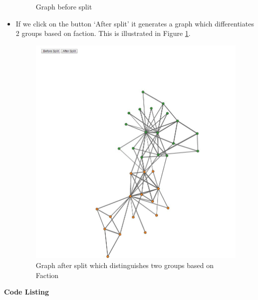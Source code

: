 \begin{itemize}
\begin{figure}[h!]
\begin{center}
\caption{Graph before split}
\label{fig:q3fig1}
\end{center}
\end{figure}
\newpage
\item   If we click on the button `After split' it generates a graph which differentiates 2 groups based on faction. This is illustrated in Figure \ref{fig:q3fig1}.
\begin{figure}[h!]
\begin{center}
\includegraphics[scale=0.55, keepaspectratio=true]{figures/3.JPG}
\caption{Graph after split which distinguishes two groups based on Faction}
\label{fig:q1fig01}
\end{center}
\end{figure}
\end{itemize}

\newpage
\textbf{Code Listing}
\sloppy




